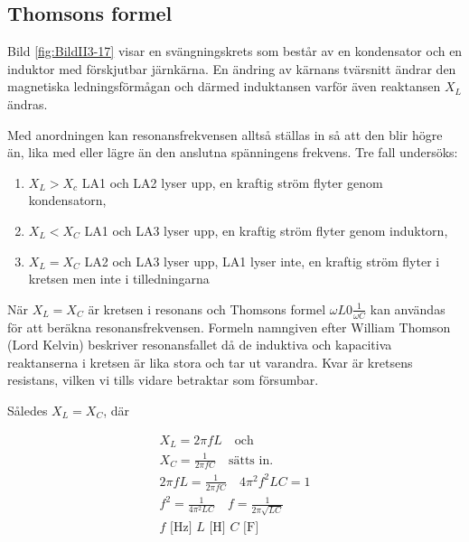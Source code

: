 \subsection{Thomsons formel}


Bild \ref{fig:BildII3-17} visar en svängningskrets som består av en
kondensator och en induktor med förskjutbar järnkärna.
En ändring av kärnans tvärsnitt ändrar den magnetiska ledningsförmågan och
därmed induktansen varför även reaktansen \(X_L\) ändras.

Med anordningen kan resonansfrekvensen alltså ställas in så att den blir högre än,
lika med eller lägre än den anslutna spänningens frekvens.
Tre fall undersöks:
\begin{enumerate}
\item \(X_L > X_c\) LA1 och LA2 lyser upp, en kraftig ström flyter genom
  kondensatorn,
\item \(X_L < X_C\) LA1 och LA3 lyser upp, en kraftig ström flyter genom
  induktorn,
\item \(X_L= X_C\) LA2 och LA3 lyser upp, LA1 lyser inte, en kraftig ström
  flyter i kretsen men inte i tilledningarna

\end{enumerate}

När \(X_L = X_C\) är kretsen i resonans och Thomsons formel
\(\omega L 0 \frac{1}{\omega C}\) kan användas för att beräkna
resonansfrekvensen.
Formeln namngiven efter William Thomson (Lord Kelvin) beskriver resonansfallet
då de induktiva och kapacitiva reaktanserna i kretsen är lika stora och tar ut
varandra.
Kvar är kretsens resistans, vilken vi tills vidare betraktar som försumbar.

Således \(X_L = X_C\), där

\begin{gather*}
  X_L = 2\pi fL \quad \text{och} \\
  X_C = \frac{1}{2\pi fC} \quad \text{sätts in.} \\
  2\pi fL = \frac{1}{2\pi fC} \quad 4\pi ^2f^2LC = 1 \\
  f^2 = \frac{1}{4\pi ^2LC} \quad f = \frac{1}{2\pi \sqrt{LC}} \\
  f\text{ [Hz] }L\text{ [H] }C\text{ [F] } \\
\end{gather*}

